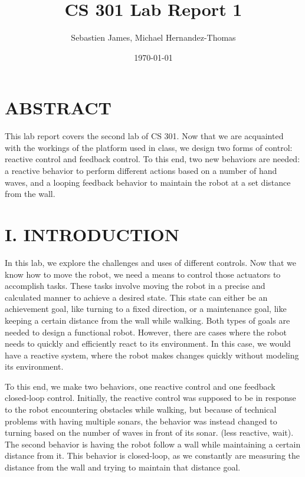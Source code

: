 \documentclass[11pt]{article}
\begin{document}
\title{CS 301 Lab Report 1}
\author{Sebastien James, Michael Hernandez-Thomas}
\date{\today}
\maketitle

\section*{ABSTRACT}
This lab report covers the second lab of CS 301. Now that we are acquainted with the workings of the platform used in class, we design two forms of control: reactive control and feedback control. To this end, two new behaviors are needed: a reactive behavior to perform different actions based on a number of hand waves, and a looping feedback behavior to maintain the robot at a set distance from the wall. 

\section*{I. INTRODUCTION}

In this lab, we explore the challenges and uses of different controls. Now that we know how to move the robot, we need a means to control those actuators to accomplish tasks. These tasks involve moving the robot in a precise and calculated manner to achieve a desired state. This state can either be an achievement goal, like turning to a fixed direction, or a maintenance goal, like keeping a certain distance from the wall while walking. Both types of goals are needed to design a functional robot. However, there are cases where the robot needs to quickly and efficiently react to its environment. In this case, we would have a reactive system, where the robot makes changes quickly without modeling its environment.

To this end, we make two behaviors, one reactive control and one feedback closed-loop control. 
Initially, the reactive control was supposed to be in response to the robot encountering obstacles while walking, but because of technical problems with having multiple sonars, the behavior was instead changed to turning based on the number of waves in front of its sonar. (less reactive, wait). 
The second behavior is having the robot follow a wall while maintaining a certain distance from it. This behavior is closed-loop, as we constantly are measuring the distance from the wall and trying to maintain that distance goal.
\end{document}
